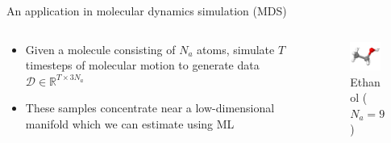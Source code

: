 
\begin{frame}{An application in molecular dynamics simulation (MDS)}
\begin{columns}
\begin{column}{0.5\textwidth}
\begin{itemize}
    \item Given a molecule consisting of $N_a$ atoms, simulate $T$ timesteps of molecular motion to generate data $\mathcal D \in \mathbb R^{T \times 3N_a}$
    \item These samples concentrate near a low-dimensional manifold which we can estimate using ML
\end{itemize}
\end{column}
\begin{column}{0.5\textwidth}
\begin{figure}
    \includegraphics[width=4cm]{img/ethanol.png}
    \caption*{Ethanol ($N_a = 9$) \parencite{Chmiela2018-at}}
\end{figure}
\end{column}
\end{columns}
\end{frame}
